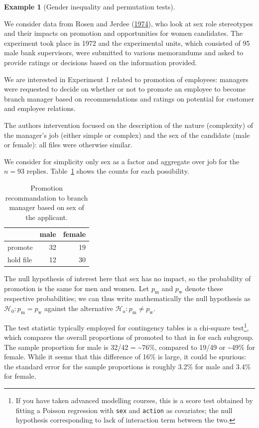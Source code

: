 \documentclass[
  11pt,
  letterpaper,
]{scrbook}
\theoremstyle{definition}
\newtheorem{example}{Example}[chapter]
\theoremstyle{remark}
\begin{document}
\begin{example}[Gender inequality and permutation
tests]\protect\hypertarget{exm-rosenjerdee74}{}\label{exm-rosenjerdee74}

We consider data from Rosen and Jerdee
(\protect\hyperlink{ref-Rosen:1974}{1974}), who look at sex role
stereotypes and their impacts on promotion and opportunities for women
candidates. The experiment took place in 1972 and the experimental
units, which consisted of 95 male bank supervisors, were submitted to
various memorandums and asked to provide ratings or decisions based on
the information provided.

We are interested in Experiment 1 related to promotion of employees:
managers were requested to decide on whether or not to promote an
employee to become branch manager based on recommendations and ratings
on potential for customer and employee relations.

The authors intervention focused on the description of the nature
(complexity) of the manager's job (either simple or complex) and the sex
of the candidate (male or female): all files were otherwise similar.

We consider for simplicity only sex as a factor and aggregate over job
for the \(n=93\) replies. Table~\ref{tbl-rosen-table1} shows the counts
for each possibility.

\hypertarget{tbl-rosen-table1}{}
\begin{table}
\caption{\label{tbl-rosen-table1}Promotion recommandation to branch manager based on sex of the
applicant. }\tabularnewline

\centering
\begin{tabular}{lrr}
\toprule
  & male & female\\
\midrule
promote & 32 & 19\\
hold file & 12 & 30\\
\bottomrule
\end{tabular}
\end{table}

The null hypothesis of interest here that sex has no impact, so the
probability of promotion is the same for men and women. Let
\(p_{\text{m}}\) and \(p_{\text{w}}\) denote these respective
probabilities; we can thus write mathematically the null hypothesis as
\(\mathscr{H}_0: p_{\text{m}} = p_{\text{w}}\) against the alternative
\(\mathscr{H}_a: p_{\text{m}} \neq p_{\text{w}}\).

The test statistic typically employed for contingency tables is a
chi-square test\footnote{If you have taken advanced modelling courses,
  this is a score test obtained by fitting a Poisson regression with
  \texttt{sex} and \texttt{action} as covariates; the null hypothesis
  corresponding to lack of interaction term between the two.}, which
compares the overall proportions of promoted to that in for each
subgroup. The sample proportion for male is 32/42 = \textasciitilde76\%,
compared to 19/49 or \textasciitilde49\% for female. While it seems that
this difference of 16\% is large, it could be spurious: the standard
error for the sample proportions is roughly 3.2\% for male and 3.4\% for
female.


\end{example}
\end{document}
